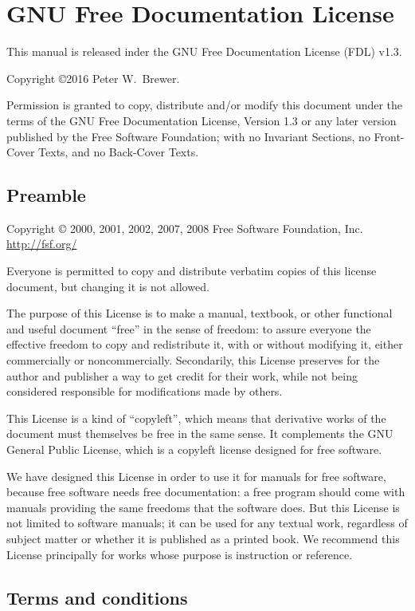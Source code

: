 \chapter{GNU Free Documentation License}
\label{txt:FDLStart}

This manual is released inder the GNU Free Documentation License (FDL) v1.3.


Copyright \copyright  2016 Peter W.\ Brewer.

Permission is granted to copy, distribute and/or modify this document under the terms of the GNU Free Documentation License, Version 1.3 or any later version published by the Free Software Foundation; with no Invariant Sections, no Front-Cover Texts, and no Back-Cover Texts.

\section{Preamble}
\scriptsize
Copyright \copyright{} 2000, 2001, 2002, 2007, 2008  Free Software Foundation, Inc. \url{http://fsf.org/}

Everyone is permitted to copy and distribute verbatim copies of this license document, but changing it is not allowed.

The purpose of this License is to make a manual, textbook, or other
functional and useful document ``free'' in the sense of freedom: to
assure everyone the effective freedom to copy and redistribute it,
with or without modifying it, either commercially or noncommercially.
Secondarily, this License preserves for the author and publisher a way
to get credit for their work, while not being considered responsible
for modifications made by others.

This License is a kind of ``copyleft'', which means that derivative
works of the document must themselves be free in the same sense.  It
complements the GNU General Public License, which is a copyleft
license designed for free software.

We have designed this License in order to use it for manuals for free
software, because free software needs free documentation: a free
program should come with manuals providing the same freedoms that the
software does.  But this License is not limited to software manuals;
it can be used for any textual work, regardless of subject matter or
whether it is published as a printed book.  We recommend this License
principally for works whose purpose is instruction or reference.
\normalsize


\section{Terms and conditions}
\scriptsize

